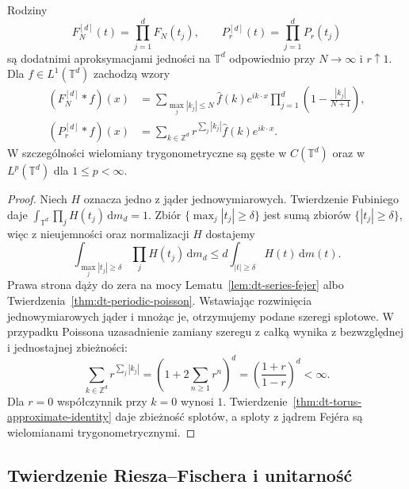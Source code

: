 \begin{wniosek}
\label{cor:dt-torus-fejer-poisson}
Rodziny
\[
 F_N^{[d]}(t)=\prod_{j=1}^dF_N(t_j),\qquad
 P_r^{[d]}(t)=\prod_{j=1}^dP_r(t_j)
\]
są dodatnimi aproksymacjami jedności na $\mathbb T^d$
odpowiednio przy $N\to\infty$ i $r\uparrow1$.
Dla $f\in L^1(\mathbb T^d)$ zachodzą wzory
\[
 \begin{aligned}
 (F_N^{[d]}*f)(x)
 &=\sum_{\max_j|k_j|\le N}
 \widehat f(k)e^{ik\cdot x}
 \prod_{j=1}^d\left(1-\frac{|k_j|}{N+1}\right),\\
 (P_r^{[d]}*f)(x)
 &=\sum_{k\in\mathbb Z^d}r^{\sum_j|k_j|}
 \widehat f(k)e^{ik\cdot x}.
 \end{aligned}
\]
W szczególności wielomiany trygonometryczne są
gęste w $C(\mathbb T^d)$ oraz w $L^p(\mathbb T^d)$
dla $1\le p<\infty$.
\end{wniosek}
\begin{proof}
Niech $H$ oznacza jedno z jąder jednowymiarowych.
Twierdzenie Fubiniego daje
$\int_{\mathbb T^d}\prod_j H(t_j)\,\mathrm dm_d=1$.
Zbiór $\{\max_j|t_j|\ge\delta\}$ jest sumą
zbiorów $\{|t_j|\ge\delta\}$, więc z nieujemności
oraz normalizacji $H$ dostajemy
\[
 \int_{\max_j|t_j|\ge\delta}\prod_j H(t_j)\,\mathrm dm_d
 \le d\int_{|t|\ge\delta}H(t)\,\mathrm dm(t).
\]
Prawa strona dąży do zera na mocy
Lematu~\ref{lem:dt-series-fejer} albo
Twierdzenia~\ref{thm:dt-periodic-poisson}.
Wstawiając rozwinięcia jednowymiarowych jąder
i mnożąc je, otrzymujemy podane szeregi splotowe.
W przypadku Poissona uzasadnienie zamiany szeregu
z całką wynika z bezwzględnej i jednostajnej zbieżności:
\[
 \sum_{k\in\mathbb Z^d} r^{\sum_j|k_j|}
 =\left(1+2\sum_{n\ge1}r^n\right)^d
 =\left(\frac{1+r}{1-r}\right)^d<\infty.
\]
Dla $r=0$ współczynnik przy $k=0$ wynosi $1$.
Twierdzenie~\ref{thm:dt-torus-approximate-identity}
daje zbieżność splotów, a sploty z jądrem Fejéra
są wielomianami trygonometrycznymi.
\end{proof}

\subsection{Twierdzenie Riesza--Fischera i unitarność}

